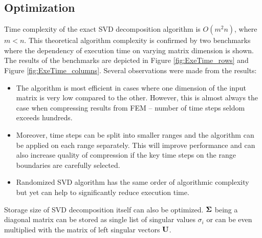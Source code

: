 \subsection{Optimization}


Time complexity of the exact SVD decomposition algorithm is $O(m^2n)$, where $m<n$. This theoretical algorithm complexity is confirmed by two benchmarks where the dependency of execution time on varying matrix dimension is shown. The results of the benchmarks are depicted in Figure \ref{fig:ExeTime_rows} and Figure \ref{fig:ExeTime_columns}. Several observations were made from the results:

\begin{itemize}
\item The algorithm is most efficient in cases where one dimension of the input matrix is very low compared to the other. However, this is almost always the case when compressing results from FEM -- number of time steps seldom exceeds hundreds.
\item Moreover, time steps can be split into smaller ranges and the algorithm can be applied on each range separately. This will improve performance and can also increase quality of compression if the key time steps on the range boundaries are carefully selected.
\item Randomized SVD algorithm has the same order of algorithmic complexity but yet can help to significantly reduce execution time.
\end{itemize}

Storage size of SVD decomposition itself can also be optimized. $\mathbf{\Sigma}$ being a diagonal matrix can be stored as single list of singular values $\sigma_{i}$ or can be even multiplied with the matrix of left singular vectors $\mathbf{U}$.

